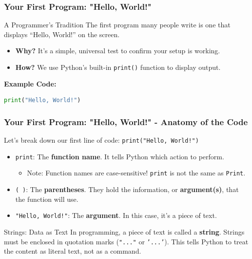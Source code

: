 \documentclass{beamer}
\begin{document}
\begin{frame}[fragile]
    \frametitle{Your First Program: "Hello, World!"}
    
    \begin{block}{A Programmer's Tradition}
        The first program many people write is one that displays ``Hello, World!'' on the screen.
    \end{block}
    
    \begin{itemize}
        \item \textbf{Why?} It's a simple, universal test to confirm your setup is working.
        \item \textbf{How?} We use Python's built-in \texttt{print()} function to display output.
    \end{itemize}
    
    \vspace{1em}
    
    \textbf{Example Code:}
    \begin{lstlisting}[language=Python]
print("Hello, World!")
    \end{lstlisting}
    
\end{frame}

\begin{frame}[fragile]
    \frametitle{Your First Program: "Hello, World!" - Anatomy of the Code}
    
    Let's break down our first line of code: \texttt{print("Hello, World!")}
    
    \begin{itemize}
        \item \texttt{print}: The \textbf{function name}. It tells Python which action to perform.
        \begin{itemize}
            \item Note: Function names are case-sensitive! \texttt{print} is not the same as \texttt{Print}.
        \end{itemize}
        
        \item \texttt{( )}: The \textbf{parentheses}. They hold the information, or \textbf{argument(s)}, that the function will use.
        
        \item \texttt{"Hello, World!"}: The \textbf{argument}. In this case, it's a piece of text.
    \end{itemize}
    
    \begin{block}{Strings: Data as Text}
        In programming, a piece of text is called a \textbf{string}. Strings must be enclosed in quotation marks (\texttt{"..."} or \texttt{'...'}). This tells Python to treat the content as literal text, not as a command.
    \end{block}
    
\end{frame}
\end{document}
